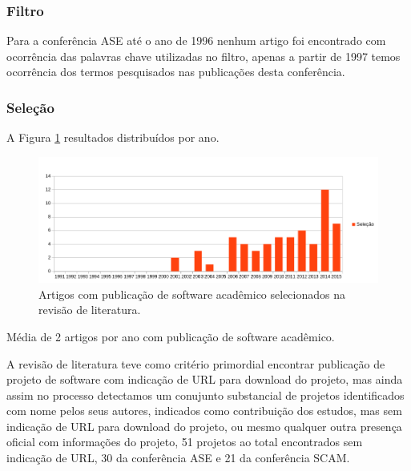 \subsubsection{Filtro}

Para a conferência ASE até o ano de 1996 nenhum artigo foi encontrado com
ocorrência das palavras chave utilizadas no filtro, apenas a partir de 1997
temos ocorrência dos termos pesquisados nas publicações desta conferência.

\subsubsection{Seleção}

A Figura \ref{artigos-com-software-por-ano} resultados distribuídos por ano.

\begin{figure}[h]
  \center
  \includegraphics[scale=0.65]{imagens/artigos-com-software-por-ano.png}
  \caption{Artigos com publicação de software acadêmico selecionados na revisão de literatura.}
  \label{artigos-com-software-por-ano}
\end{figure}

Média de 2 artigos por ano com publicação de software acadêmico.

A revisão de literatura teve como critério primordial encontrar publicação
de projeto de software com indicação de URL para download do projeto, mas
ainda assim no processo detectamos um conujunto substancial de projetos
identificados com nome pelos seus autores, indicados como contribuição dos
estudos, mas sem indicação de URL para download do projeto, ou mesmo qualquer
outra presença oficial com informações do projeto, 51 projetos ao total
encontrados sem indicação de URL, 30 da conferência ASE e 21 da conferência SCAM.


